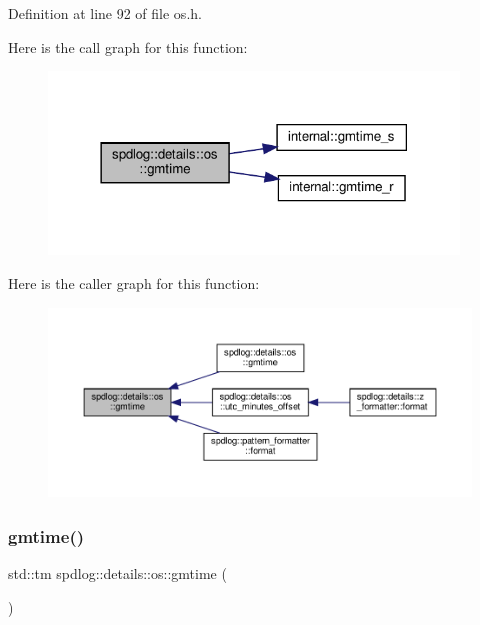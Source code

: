 Definition at line 92 of file os.\+h.

Here is the call graph for this function\+:
\nopagebreak
\begin{figure}[H]
\begin{center}
\leavevmode
\includegraphics[width=309pt]{namespacespdlog_1_1details_1_1os_ac993ad051e07cd5bda5328be2a54b0a8_cgraph}
\end{center}
\end{figure}
Here is the caller graph for this function\+:
\nopagebreak
\begin{figure}[H]
\begin{center}
\leavevmode
\includegraphics[width=350pt]{namespacespdlog_1_1details_1_1os_ac993ad051e07cd5bda5328be2a54b0a8_icgraph}
\end{center}
\end{figure}
\mbox{\label{namespacespdlog_1_1details_1_1os_a504776f0a18b0090f66778f7ad8add0b}} 
\subsubsection{\texorpdfstring{gmtime()}{gmtime()}\hspace{0.1cm}{\footnotesize\ttfamily [2/2]}}
{\footnotesize\ttfamily std\+::tm spdlog\+::details\+::os\+::gmtime (\begin{DoxyParamCaption}{ }\end{DoxyParamCaption})\hspace{0.3cm}{\ttfamily [inline]}}



